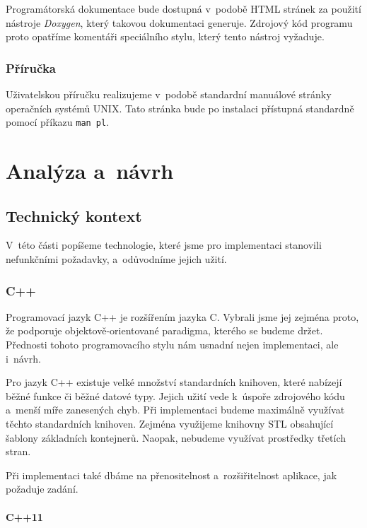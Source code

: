 \documentclass[thesis=B,czech,hidelinks]{thesis}[2012/06/26]
\begin{document}
Programátorská dokumentace bude dostupná v~podobě HTML stránek za použití nástroje \emph{Doxygen}, který takovou dokumentaci generuje. Zdrojový kód programu proto opatříme komentáři speciálního stylu, který tento nástroj vyžaduje.

\subsection{Příručka}

Uživatelskou příručku realizujeme v~podobě standardní manuálové stránky operačních systémů UNIX. Tato stránka bude po instalaci přístupná standardně pomocí příkazu \texttt{man pl}.

%
%
%

\chapter{Analýza a~návrh}

\section{Technický kontext}

V~této části popíšeme technologie, které jsme pro implementaci stanovili nefunkčními požadavky, a~odůvodníme jejich užití.

\subsection{C++}

Programovací jazyk C++ je rozšířením jazyka C. Vybrali jsme jej zejména proto, že podporuje objektově-orientované paradigma, kterého se budeme držet. Přednosti tohoto programovacího stylu nám usnadní nejen implementaci, ale i~návrh.

Pro jazyk C++ existuje velké množství standardních knihoven, které nabízejí běžné funkce či běžné datové typy. Jejich užití vede k~úspoře zdrojového kódu a~menší míře zanesených chyb. Při implementaci budeme maximálně využívat těchto standardních knihoven. Zejména využijeme knihovny STL obsahující šablony základních kontejnerů. Naopak, nebudeme využívat prostředky třetích stran.

Při implementaci také dbáme na přenositelnost a~rozšiřitelnost aplikace, jak požaduje zadání.

\subsubsection{C++11}
\end{document}
